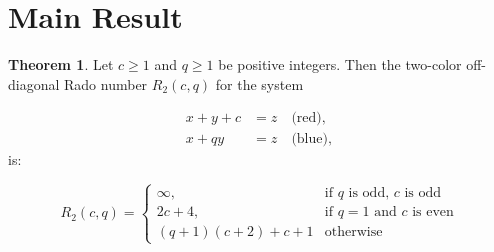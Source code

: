 \documentclass[preprint,12pt]{elsarticle}
\theoremstyle{plain}
\theoremstyle{definition}
\newtheorem{theorem}{Theorem}
\begin{document}
\section{Main Result}
\begin{theorem}
Let $c\ge1$ and $q\ge 1$ be positive integers. Then the two-color off-diagonal Rado number $R_2(c,q)$ for the system 

\begin{align*}
x+y+c &= z \quad \text{(red)},\\
x+qy  &= z \quad \text{(blue)},
\end{align*}
is:

\[
R_2(c,q) =
\begin{cases}
\infty, & \text{if $q$ is odd, $c$ is odd} \\
2c+4,  & \text{if $q=1$ and $c$ is even} \\
(q+1)(c+2)+c+1 & \text{otherwise }
\end{cases}
\]
\end{theorem}
\end{document}
